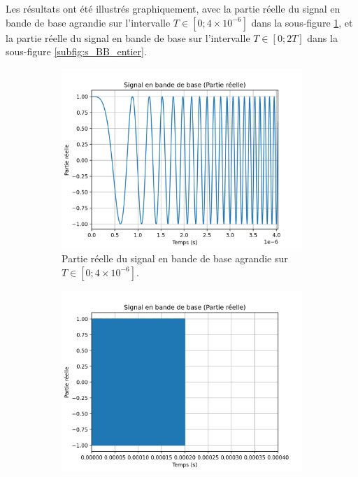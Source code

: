 
Les résultats ont été illustrés graphiquement, avec la partie réelle du signal en bande de base agrandie sur l'intervalle \( T \in [0; 4 \times 10^{-6}]\) dans la  sous-figure \ref{subfig:s_BB_zoom}, et la partie réelle du signal en bande de base sur l'intervalle \( T \in [0; 2T]\) dans la sous-figure \ref{subfig:s_BB_entier}.

\begin{figure}[H]
  \centering
  \begin{subfigure}[b]{0.45\textwidth}
    \includegraphics[width=\textwidth]{Pictures/BNDBR_SST.png}
    \caption{Partie réelle du signal en bande de base agrandie sur \(T \in [0; 4 \times 10^{-6}]\).}
    \label{subfig:s_BB_zoom}
  \end{subfigure}
  \hfill
  \begin{subfigure}[b]{0.45\textwidth}
    \includegraphics[width=\textwidth]{Pictures/BNDBR_SST(1).png}

\end{subfigure}
\end{figure}

